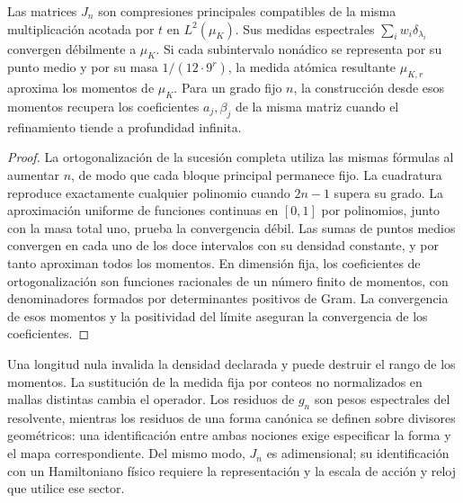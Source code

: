 \begin{proposition}
\label{prop:jacobi-refinement}
Las matrices \(J_n\) son compresiones principales compatibles de la
misma multiplicación acotada por \(t\) en \(L^2(\mu_K)\). Sus
medidas espectrales \(\sum_iw_i\delta_{\lambda_i}\) convergen
débilmente a \(\mu_K\). Si cada subintervalo nonádico se representa
por su punto medio y por su masa \(1/(12\cdot9^r)\), la medida
atómica resultante \(\mu_{K,r}\) aproxima los momentos de
\(\mu_K\). Para un grado fijo \(n\), la construcción desde esos
momentos recupera los coeficientes \(a_j,\beta_j\) de la misma
matriz cuando el refinamiento tiende a profundidad infinita.
\end{proposition}
\begin{proof}
La ortogonalización de la sucesión completa utiliza las mismas fórmulas
al aumentar \(n\), de modo que cada bloque principal permanece fijo.
La cuadratura reproduce exactamente cualquier polinomio cuando
\(2n-1\) supera su grado. La aproximación uniforme de funciones
continuas en \([0,1]\) por polinomios, junto con la masa total uno,
prueba la convergencia débil. Las sumas de puntos medios convergen
en cada uno de los doce intervalos con su densidad constante, y por
tanto aproximan todos los momentos. En dimensión fija, los coeficientes de
ortogonalización son funciones racionales de un número finito de
momentos, con denominadores formados por determinantes positivos de
Gram. La convergencia de esos momentos y la positividad del límite
aseguran la convergencia de los coeficientes.
\end{proof}

\begin{falsifier}
Una longitud nula invalida la densidad declarada y puede destruir el
rango de los momentos. La sustitución de la medida fija por conteos
no normalizados en mallas distintas cambia el operador. Los residuos
de \(g_n\) son pesos espectrales del resolvente, mientras los residuos
de una forma canónica se definen sobre divisores geométricos: una
identificación entre ambas nociones exige especificar la forma y el
mapa correspondiente. Del mismo modo, \(J_n\) es adimensional; su
identificación con un Hamiltoniano físico requiere la representación
y la escala de acción y reloj que utilice ese sector.
\end{falsifier}


